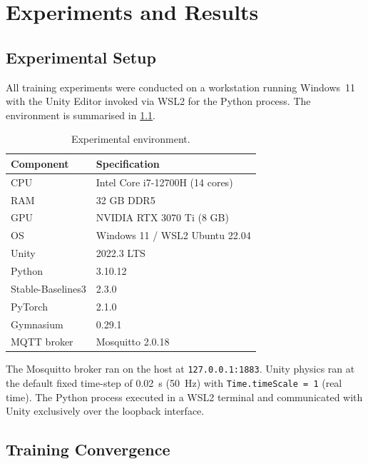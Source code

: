 \chapter{Experiments and Results}\label{ch:experiments}
\thispagestyle{pagestyle}

\section{Experimental Setup}
\label{sec:setup}

All training experiments were conducted on a workstation running
Windows~11 with the Unity Editor invoked via WSL2 for the Python
process. The environment is summarised in \cref{table:setup}.

\begin{table}[H]
\caption{Experimental environment.}
\label{table:setup}
\begin{tabular}{|p{4cm}|p{7cm}|}
  \hline
  \textbf{Component} & \textbf{Specification} \\
  \hline
  CPU              & Intel Core i7-12700H (14 cores) \\
  \hline
  RAM              & 32 GB DDR5 \\
  \hline
  GPU              & NVIDIA RTX 3070 Ti (8 GB) \\
  \hline
  OS               & Windows 11 / WSL2 Ubuntu 22.04 \\
  \hline
  Unity            & 2022.3 LTS \\
  \hline
  Python           & 3.10.12 \\
  \hline
  Stable-Baselines3 & 2.3.0 \\
  \hline
  PyTorch          & 2.1.0 \\
  \hline
  Gymnasium        & 0.29.1 \\
  \hline
  MQTT broker      & Mosquitto 2.0.18 \\
  \hline
\end{tabular}
\end{table}

The Mosquitto broker ran on the host at \texttt{127.0.0.1:1883}. Unity
physics ran at the default fixed time-step of 0.02~s (50~Hz) with
\texttt{Time.timeScale = 1} (real time). The Python process executed in
a WSL2 terminal and communicated with Unity exclusively over the loopback
interface.

\section{Training Convergence}
\label{sec:convergence}

